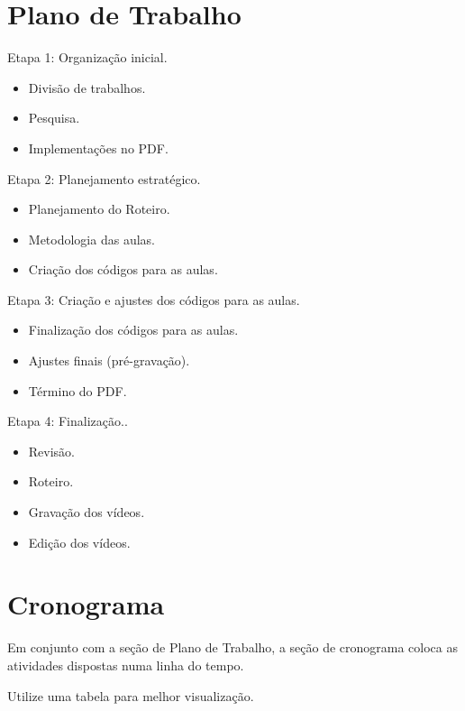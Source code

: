 \documentclass[a4paper,12pt]{article}  %
\begin{document}
\section{Plano de Trabalho}

     Etapa 1: Organização inicial.
    \begin{itemize}
        \item Divisão de trabalhos.
        \item Pesquisa.
        \item Implementações no PDF.
    \end{itemize}
     Etapa 2: Planejamento estratégico.
    \begin{itemize}
        \item Planejamento do Roteiro.
        \item Metodologia das aulas.
        \item Criação dos códigos para as aulas.
    \end{itemize}
     Etapa 3: Criação e ajustes dos códigos para as aulas.
    \begin{itemize}
        \item Finalização dos códigos para as aulas.
        \item Ajustes finais (pré-gravação).
        \item Término do PDF.
    \end{itemize}
     Etapa 4: Finalização..
    \begin{itemize}
        \item Revisão.
        \item Roteiro.
        \item Gravação dos vídeos.
        \item Edição dos vídeos.
    \end{itemize}

\section{Cronograma}

   Em conjunto com a seção de Plano de Trabalho, a seção de cronograma coloca as atividades dispostas numa linha do tempo.


   Utilize uma tabela para melhor visualização.
\end{document}
